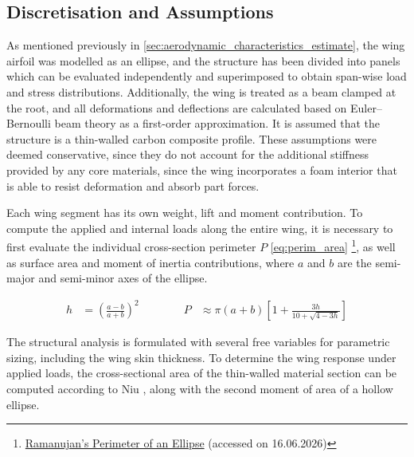 \subsection{Discretisation and Assumptions}
\label{sec:discretisation_and_assumptions}
As mentioned previously in \autoref{sec:aerodynamic_characteristics_estimate}, the wing airfoil was modelled as an ellipse, and the structure has been divided into panels which can be evaluated independently and superimposed to obtain span-wise load and stress distributions. Additionally, the wing is treated as a beam clamped at the root, and all deformations and deflections are calculated based on Euler–Bernoulli beam theory as a first-order approximation. It is assumed that the structure is a thin-walled carbon composite profile. These assumptions were deemed conservative, since they do not account for the additional stiffness provided by any core materials, since the wing incorporates a foam interior that is able to resist deformation and absorb part forces.


Each wing segment has its own weight, lift and moment contribution. To compute the applied and internal loads along the entire wing, it is necessary to first evaluate the individual cross-section perimeter $P$ \autoref{eq:perim_area} \footnote{\href{https://arxiv.org/pdf/math/0506384}{Ramanujan’s Perimeter of an Ellipse} (accessed on 16.06.2026)}, as well as surface area and moment of inertia contributions, where $a$ and $b$ are the semi-major and semi-minor axes of the ellipse. 

\begin{equation}
\begin{aligned}
h &= \left(\frac{a-b}{a+b}\right)^2
\qquad\qquad
P &\approx \pi(a+b)
\left[
1 + \frac{3h}{10 + \sqrt{4 - 3h}}
\right]
\end{aligned}
\label{eq:perim_area}
\end{equation}

The structural analysis is formulated with several free variables for parametric sizing, including the wing skin thickness. To determine the wing response under applied loads, the cross-sectional area of the thin-walled material section can be computed according to Niu \cite[p.~765]{niu1999airframe}, along with the second moment of area of a hollow ellipse.




